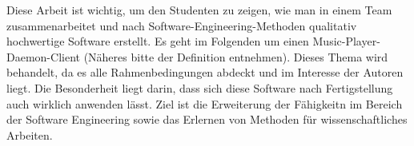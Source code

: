 Diese Arbeit ist wichtig, um den Studenten zu zeigen, wie man in einem Team zusammenarbeitet und nach
Software-Engineering-Methoden qualitativ hochwertige Software erstellt. Es geht im Folgenden um einen
Music-Player-Daemon-Client (Näheres bitte der Definition entnehmen). Dieses Thema wird behandelt, da es
alle Rahmenbedingungen abdeckt und im Interesse der Autoren liegt. Die Besonderheit liegt darin, dass
sich diese Software nach Fertigstellung auch wirklich anwenden lässt. Ziel ist die Erweiterung der
Fähigkeitn im Bereich der Software Engineering sowie das Erlernen von Methoden für wissenschaftliches Arbeiten.




